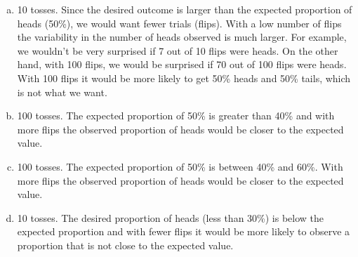 { 
{
\begin{enumerate}[(a)]
\setlength{\itemsep}{0mm}
\item 10 tosses. Since the desired outcome is larger than the expected proportion of heads (50\%), we would want fewer trials (flips). With a low number of flips the variability in the number of heads observed is much larger. For example, we wouldn't be very surprised if 7 out of 10 flips were heads. On the other hand, with 100 flips, we would be surprised if 70 out of 100 flips were heads. With 100 flips it would be more likely to get 50\% heads and 50\% tails, which is not what we want.
\item 100 tosses. The expected proportion of 50\% is greater than 40\% and with more flips the observed proportion of heads would be closer to the expected value.
\item 100 tosses. The expected proportion of 50\% is between 40\% and 60\%. With more flips the observed proportion of heads would be closer to the expected value.
\item 10 tosses. The desired proportion of heads (less than 30\%) is below the expected proportion and with fewer flips it would be more likely to observe a proportion that is not close to the expected value.
\end{enumerate}
}}



